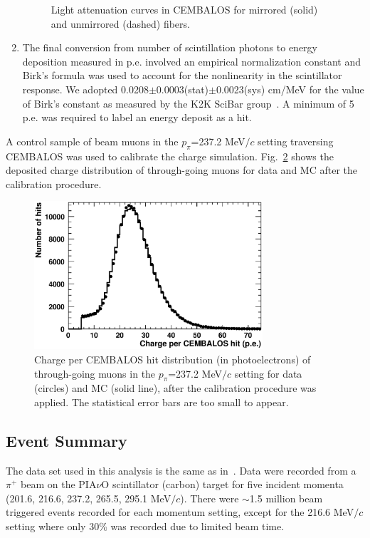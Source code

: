 \begin{enumerate}
\begin{figure}[!h]
\begin{center}
\caption{Light attenuation curves in CEMBALOS for mirrored (solid) and unmirrored (dashed) fibers.}
\label{fig:attcurves}
\end{center} 
\end{figure}

\item{The final conversion from number of scintillation photons to energy deposition measured in p.e. involved  an empirical normalization constant and Birk's formula was used to account for the nonlinearity in the scintillator response. We adopted 0.0208$\pm$0.0003(stat)$\pm$0.0023(sys) cm/MeV for the value of Birk's constant as measured by the K2K SciBar group~\cite{scibar}. A minimum of 5 p.e. was required to label an energy deposit as a hit.}
\end{enumerate}

A control sample of beam muons in the $p_{\pi}$=237.2 MeV$/c$ setting traversing CEMBALOS was used to calibrate the charge simulation. Fig.~\ref{fig:muoncharge} shows the deposited charge distribution of through-going muons for data and MC after the calibration procedure. 

\begin{figure}[!h]
\begin{center}
\includegraphics[width=85mm]{figures/muon_charge_calib.eps}
\caption{Charge per CEMBALOS hit distribution (in photoelectrons) of through-going muons in the $p_{\pi}$=237.2 MeV$/c$ setting for data (circles) and MC (solid line), after the calibration procedure was applied. The statistical error bars are too small to appear.}
\label{fig:muoncharge}
\end{center}
\end{figure}

\subsection{Event Summary}
The data set used in this analysis is the same as in~\cite{duet}. Data were recorded from a $\pi^{+}$ beam on the PIA$\nu$O scintillator (carbon) target for five incident momenta (201.6, 216.6, 237.2, 265.5, 295.1 MeV$/c$). There were $\sim$1.5 million beam triggered events recorded for each momentum setting, except for the 216.6 MeV$/c$ setting where only 30\% was recorded due to limited beam time.
